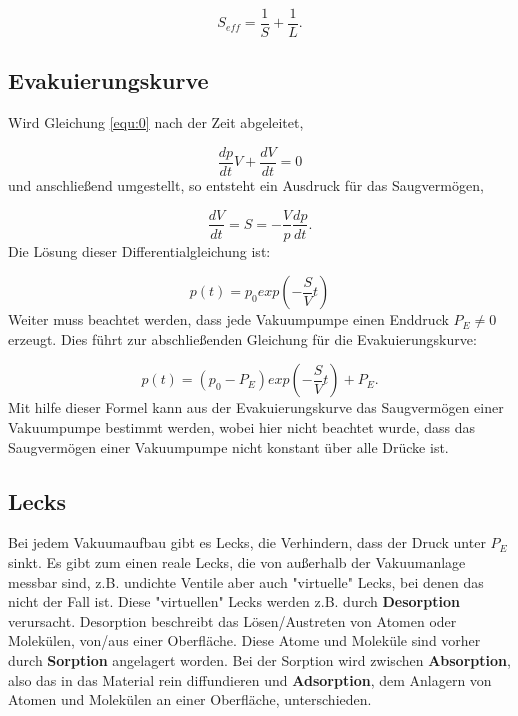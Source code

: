     \begin{equation}
    \label{equ:9}
        S_{eff} = \frac{1}{S} + \frac{1}{L}.
    \end{equation}


\subsection{Evakuierungskurve}
Wird Gleichung \eqref{equ:0} nach der Zeit abgeleitet, 

    \begin{equation}
    \label{equ:10}
        \frac{dp}{dt} V + \frac{dV}{dt} = 0
    \end{equation}
und anschließend umgestellt, so entsteht ein Ausdruck für das Saugvermögen,

    \begin{equation}
    \label{equ:11}
        \frac{dV}{dt} = S = - \frac{V}{p} \frac{dp}{dt}.
    \end{equation}
Die Lösung dieser Differentialgleichung ist:

    \begin{equation}
    \label{equ:12}
        p(t) = p_0 exp \left(- \frac{S}{V}t \right)
    \end{equation}
Weiter muss beachtet werden, dass jede Vakuumpumpe einen Enddruck $P_E \neq 0$ erzeugt. 
Dies führt zur abschließenden Gleichung für die Evakuierungskurve:

    \begin{equation}
    \label{equ:13}
        p(t) = (p_0 - P_E) exp \left(- \frac{S}{V} t \right) + P_E.
    \end{equation}
Mit hilfe dieser Formel kann aus der Evakuierungskurve das Saugvermögen einer Vakuumpumpe bestimmt werden,
wobei hier nicht beachtet wurde, dass das Saugvermögen einer Vakuumpumpe nicht konstant über alle Drücke ist.


\subsection{Lecks}
Bei jedem Vakuumaufbau gibt es Lecks, die Verhindern, dass der Druck unter $P_E$ sinkt.
Es gibt zum einen reale Lecks, die von außerhalb der Vakuumanlage messbar sind, z.B. undichte Ventile 
aber auch "virtuelle" Lecks, bei denen das nicht der Fall ist.
Diese "virtuellen" Lecks werden z.B. durch \textbf{Desorption} verursacht.
Desorption beschreibt das Lösen/Austreten von Atomen oder Molekülen, von/aus einer Oberfläche.
Diese Atome und Moleküle sind vorher durch \textbf{Sorption} angelagert worden.
Bei der Sorption wird zwischen \textbf{Absorption}, also das in das Material rein diffundieren und \textbf{Adsorption}, 
dem Anlagern von Atomen und Molekülen an einer Oberfläche, unterschieden\cite{Buch, S.62,63}.


